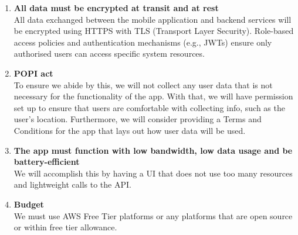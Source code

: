 \documentclass[a4paper,12pt]{article}
\begin{document}
\begin{enumerate}
    \item \textbf{All data must be encrypted at transit and at rest}\\
    All data exchanged between the mobile application and backend services will be encrypted using HTTPS with TLS (Transport Layer Security). Role-based access policies and authentication mechanisms (e.g., JWTs) ensure only authorised users can access specific system resources.

    \item \textbf{POPI act}\\
    To ensure we abide by this, we will not collect any user data that is not necessary for the functionality of the app. With that, we will have permission set up to ensure that users are comfortable with collecting info, such as the user’s location. Furthermore, we will consider providing a Terms and Conditions for the app that lays out how user data will be used.

    \item \textbf{The app must function with low bandwidth, low data usage and be battery-efficient}\\
    We will accomplish this by having a UI that does not use too many resources and lightweight calls to the API.

    \item \textbf{Budget}\\
    We must use AWS Free Tier platforms or any platforms that are open source or within free tier allowance.
\end{enumerate}
\end{document}
